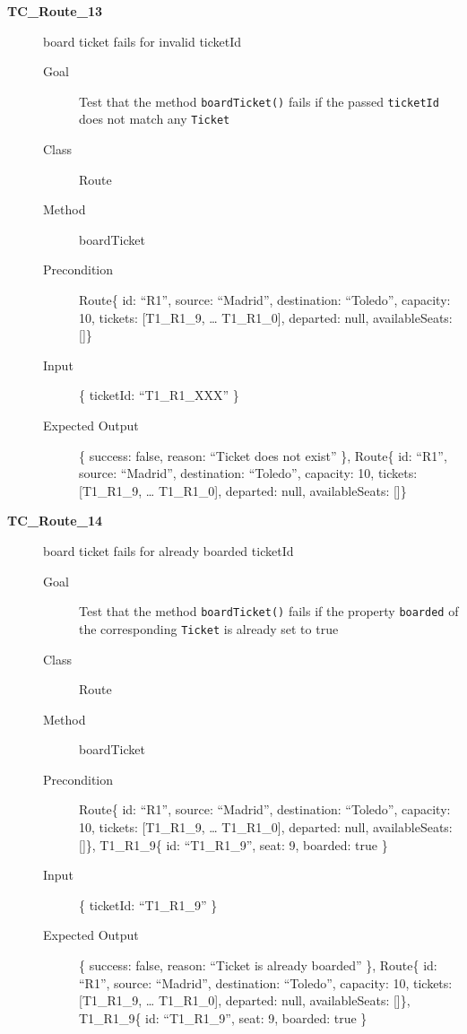 \documentclass[11pt]{article}
\begin{document}
\begin{description}
\item[{\textbf{TC\_Route\_13}}] board ticket fails for invalid ticketId
\begin{description}
\item[{Goal}] Test that the method \texttt{boardTicket()} fails if the passed \texttt{ticketId} does not match any \texttt{Ticket}
\item[{Class}] Route
\item[{Method}] boardTicket
\item[{Precondition}] Route\{ id: “R1”, source: “Madrid”, destination: “Toledo”, capacity: 10,  tickets: [T1\_R1\_9, … T1\_R1\_0], departed: null, availableSeats: []\}
\item[{Input}] \{ ticketId: “T1\_R1\_XXX” \}
\item[{Expected Output}] \{ success: false, reason: “Ticket does not exist” \},
Route\{ id: “R1”, source: “Madrid”, destination: “Toledo”, capacity: 10,  tickets: [T1\_R1\_9, … T1\_R1\_0], departed: null, availableSeats: []\}
\end{description}

\item[{\textbf{TC\_Route\_14}}] board ticket fails for already boarded ticketId
\begin{description}
\item[{Goal}] Test that the method \texttt{boardTicket()} fails if the property \texttt{boarded} of the corresponding \texttt{Ticket} is already set to true
\item[{Class}] Route
\item[{Method}] boardTicket
\item[{Precondition}] Route\{ id: “R1”, source: “Madrid”, destination: “Toledo”, capacity: 10,  tickets: [T1\_R1\_9, … T1\_R1\_0], departed: null, availableSeats: []\}, T1\_R1\_9\{ id: “T1\_R1\_9”, seat: 9, boarded: true \}
\item[{Input}] \{ ticketId: “T1\_R1\_9” \}
\item[{Expected Output}] \{ success: false, reason: “Ticket is already boarded” \},
Route\{ id: “R1”, source: “Madrid”, destination: “Toledo”, capacity: 10,  tickets: [T1\_R1\_9, … T1\_R1\_0], departed: null, availableSeats: []\}, T1\_R1\_9\{ id: “T1\_R1\_9”, seat: 9, boarded: true \}
\end{description}


\end{description}
\end{document}
